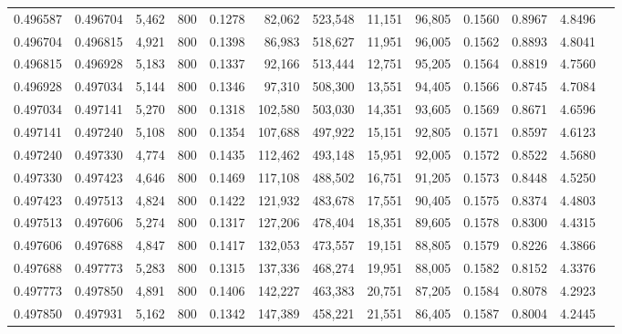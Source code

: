 \begin{tabular}{rrrrrrrrrrrrr}
0.496587 & 0.496704 & 5,462 & 800 &                                     0.1278 &  82,062 & 523,548 &  11,151 &  96,805 & 0.1560 & 0.8967 & 4.8496 \\
0.496704 & 0.496815 & 4,921 & 800 &                                     0.1398 &  86,983 & 518,627 &  11,951 &  96,005 & 0.1562 & 0.8893 & 4.8041 \\
0.496815 & 0.496928 & 5,183 & 800 &                                     0.1337 &  92,166 & 513,444 &  12,751 &  95,205 & 0.1564 & 0.8819 & 4.7560 \\
0.496928 & 0.497034 & 5,144 & 800 &                                     0.1346 &  97,310 & 508,300 &  13,551 &  94,405 & 0.1566 & 0.8745 & 4.7084 \\
0.497034 & 0.497141 & 5,270 & 800 &                                     0.1318 & 102,580 & 503,030 &  14,351 &  93,605 & 0.1569 & 0.8671 & 4.6596 \\
0.497141 & 0.497240 & 5,108 & 800 &                                     0.1354 & 107,688 & 497,922 &  15,151 &  92,805 & 0.1571 & 0.8597 & 4.6123 \\
0.497240 & 0.497330 & 4,774 & 800 &                                     0.1435 & 112,462 & 493,148 &  15,951 &  92,005 & 0.1572 & 0.8522 & 4.5680 \\
0.497330 & 0.497423 & 4,646 & 800 &                                     0.1469 & 117,108 & 488,502 &  16,751 &  91,205 & 0.1573 & 0.8448 & 4.5250 \\
0.497423 & 0.497513 & 4,824 & 800 &                                     0.1422 & 121,932 & 483,678 &  17,551 &  90,405 & 0.1575 & 0.8374 & 4.4803 \\
0.497513 & 0.497606 & 5,274 & 800 &                                     0.1317 & 127,206 & 478,404 &  18,351 &  89,605 & 0.1578 & 0.8300 & 4.4315 \\
0.497606 & 0.497688 & 4,847 & 800 &                                     0.1417 & 132,053 & 473,557 &  19,151 &  88,805 & 0.1579 & 0.8226 & 4.3866 \\
0.497688 & 0.497773 & 5,283 & 800 &                                     0.1315 & 137,336 & 468,274 &  19,951 &  88,005 & 0.1582 & 0.8152 & 4.3376 \\
0.497773 & 0.497850 & 4,891 & 800 &                                     0.1406 & 142,227 & 463,383 &  20,751 &  87,205 & 0.1584 & 0.8078 & 4.2923 \\
0.497850 & 0.497931 & 5,162 & 800 &                                     0.1342 & 147,389 & 458,221 &  21,551 &  86,405 & 0.1587 & 0.8004 & 4.2445 \\

\end{tabular}
